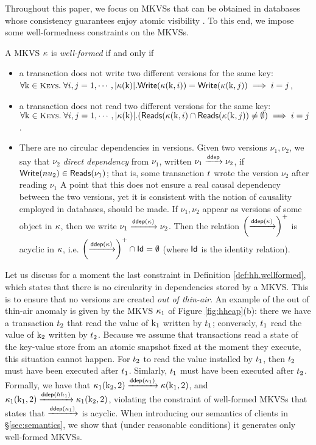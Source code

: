 Throughout this paper, we focus on MKVSs that can be obtained in 
databases whose consistency guarantees enjoy atomic visibility 
\cite{framework-concur,SIanalysis,laws}. To this end, we impose 
some well-formedness constraints on the MKVSs.

\begin{definition}
\label{def:hh.wellformed}
\label{def:ddep}
A MKVS $\kappa$ is \emph{well-formed} if and only if 
\begin{itemize}
\item a transaction does not write two different versions for the same key: 
$\forall \key{k} \in \Addr.\;\forall i, j = 1,\cdots, \lvert \hh(\key{k}) \rvert. 
\WTx(\hh(\key{k}, i)) = \WTx(\hh(\key{k}, j)) \implies i = j$, 
\item a transaction does not read two different versions for the same key:  
$\forall \key{k} \in \Addr.\;\forall i, j = 1,\cdots, \lvert \hh(\key{k}) \rvert. 
(\RTx(\hh(\key{k},i) \cap \RTx(\hh(\key{k}, j)) \neq \emptyset) \implies i = j$.
\item There are no circular dependencies in versions. Given two versions 
$\nu_1, \nu_2$, we say that $\nu_2$ \emph{direct dependency} from 
$\nu_1$, written $\nu_1 \xrightarrow{\mathsf{ddep}} \nu_2$, if $\mathsf{Write}(nu_2) \in \mathsf{Reads}(\nu_1)$; 
that is, some transaction $t$ wrote the version $\nu_2$ after reading $\nu_1$ 
\ac{A point that this does not ensure a real causal dependency between the 
two versions, yet it is consistent with the notion of causality employed in databases, 
should be made}. If $\nu_1, \nu_2$ appear as versions of some object in 
$\kappa$, then we write $\nu_1 \xrightarrow{\mathsf{ddep}(\kappa)} \nu_2$. Then the relation $\left(\xrightarrow{\mathsf{ddep}(\kappa)}\right)^{+}$ is acyclic in $\kappa$, 
i.e. $\left(\xrightarrow{\mathsf{ddep}(\kappa)} \right)^{+} \cap \mathsf{Id} = \emptyset$ (where $\mathsf{Id}$ is 
the identity relation).
\end{itemize}
\end{definition}
Let us discuss for a moment the last constraint in Definition \ref{def:hh.wellformed}, 
which states that there is no circularity in dependencies stored by a MKVS. This is 
to ensure that no versions are created \emph{out of thin-air}. An example of the 
out of thin-air anomaly is given by the MKVS $\kappa_1$ of Figure \ref{fig:hheap}(b): 
there we have a transaction $t_2$ that read the value of $\mathrm{k}_1$ written 
by $t_1$; conversely, $t_1$ read the value of $\mathrm{k}_2$ written by $t_2$. 
Because we assume that transactions read a state of the key-value store from 
an atomic snapshot fixed at the moment they execute, this situation cannot happen. 
For $t_2$ to read the value installed by $t_1$, then $t_2$ 
must have been executed after $t_1$. Simlarly, $t_1$ must have been 
executed after $t_2$.
Formally, we have that $\kappa_1(\mathrm{k}_2, 2) \xrightarrow{\mathsf{ddep}(\kappa_1)} \kappa(\mathrm{k}_1, 2)$, 
and $\kappa_1(\mathrm{k}_1, 2) \xrightarrow{\mathsf{ddep}(hh_1)} \kappa_1(\mathrm{k}_2, 2)$, violating the 
constraint of well-formed MKVSs that states that $\xrightarrow{\mathsf{ddep}(\kappa_1)}$ is acyclic. 
When introducing our semantics of clients in \S \ref{sec:semantics}, we show that 
(under reasonable conditions) it generates only well-formed MKVSs.

